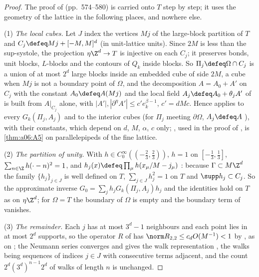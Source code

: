 \begin{proof}
The proof of \cite[Sect.~2]{Ba4} (pp.~574--580) is carried onto $T$ step by step; it uses the geometry of the lattice in the following places, and nowhere else.

(1) \emph{The local cubes.} Let $J$ index the vertices $Mj$ of the large-block partition of $T$ and $C_j\defeq Mj+[-M,M]^d$ (in unit-lattice units). Since $2M$ is less than the sup-systole, the projection $\eta\Z^d\to T$ is injective on each $C_j$; it preserves bonds, unit blocks, $L$-blocks and the contours of $Q_k$ inside blocks. So $\Pi_j\defeq\Omega\cap C_j$ \cite[p.~575]{Ba4} is a union of at most $2^d$ large blocks inside an embedded cube of side $2M$, a cube when $Mj$ is not a boundary point of $\Omega$, and the decomposition $A=A_0+A'$ on $C_j$ with the constant $A_0\defeq A(Mj)$ and the local field $A_j\defeq A_0+\theta_jA'$ of \cite[p.~575]{Ba4} is built from $A|_{C_j}$ alone, with $|A'|,|\partial^\eta A'|\le c'e_k^{\beta-1}$, $c'=dMc$. Hence \cite[Lemma~2.1]{Ba4} applies to every $G_k(\Pi_j,A_j)$ and \cite[Lemma~2.2]{Ba4} to the interior cubes (for $\Pi_j$ meeting $\partial\Omega$, $A_j\defeq A$ \cite[p.~575]{Ba4}), with their constants, which depend on $d$, $M$, $\alpha$, $c$ only; \cite[Lemma~2.4]{Ba4}, used in the proof of \cite[Lemma~2.2]{Ba4}, is \cref{thm:a06:A5} on parallelepipeds of the fine lattice.

(2) \emph{The partition of unity.} With $h\in C_0^\infty((-\frac23,\frac23))$, $h=1$ on $[-\frac13,\frac13]$, $\sum_{n\in\Z}h(\cdot-n)^2=1$, and $h_j(x)\defeq\prod_\mu h(x_\mu/M-j_\mu)$ \cite[p.~575]{Ba4}: because $\Gamma\subset M\Z^d$ the family $\{h_j\}_{j\in J}$ is well defined on $T$, $\sum_{j\in J}h_j^2=1$ on $T$ and $\supp h_j\subset C_j$. So the approximate inverse $G_0=\sum_jh_jG_k(\Pi_j,A_j)h_j$ \cite[(2.2)]{Ba4} and the identities \cite[(2.3)--(2.9)]{Ba4} hold on $T$ as on $\eta\Z^d$; for $\Omega=T$ the boundary of $\Omega$ is empty and the boundary term of \cite[(2.6)]{Ba4} vanishes.

(3) \emph{The remainder.} Each $j$ has at most $3^d-1$ neighbours and each point lies in at most $2^d$ supports, so the operator $R$ of \cite[(2.11)]{Ba4} has $\norm R_{2,2}\le c_dO(M^{-1})<1$ by \cite[Lemma~2.1]{Ba4}, as on \cite[p.~577]{Ba4}; the Neumann series \cite[(2.12)]{Ba4} converges and gives the walk representation \cite[(2.13)]{Ba4}, the walks being sequences of indices $j\in J$ with consecutive terms adjacent, and the count $2^d(3^d)^{n-1}2^d$ of walks of length $n$ \cite[p.~579]{Ba4} is unchanged.


\end{proof}
